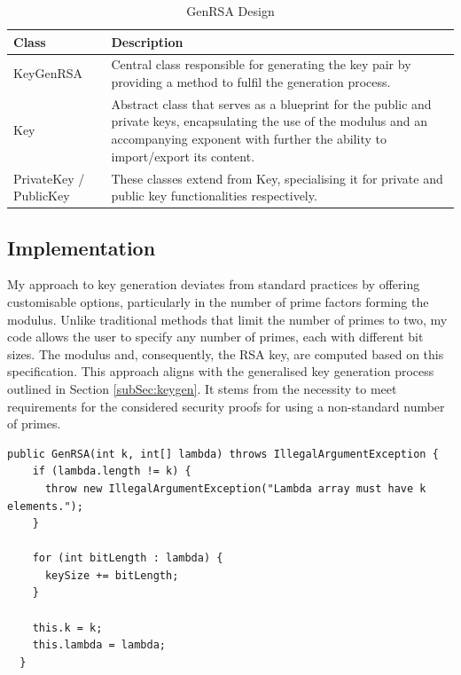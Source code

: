 \documentclass[]{final_report}
\theoremstyle{definition}
\begin{document}
\begin{table}[H]
    \centering
    \caption{GenRSA Design}
    \label{tab:actors_description}
    \begin{tabular}{|l|p{10cm}|}
    \hline
    \textbf{Class} & \textbf{Description} \\
    \hline
    KeyGenRSA & Central class responsible for generating the key pair by providing a method to fulfil the generation process. \\
    \hline
    Key & Abstract class that serves as a blueprint for the public and private keys, encapsulating the use of the modulus and an accompanying exponent with further the ability to import/export its content. \\
    \hline
    PrivateKey / PublicKey & These classes extend from Key, specialising it for private and public key functionalities respectively. \\
    \hline
    \end{tabular}
\end{table}



\subsection{Implementation}
My approach to key generation deviates from standard practices by offering customisable options, particularly in the number of prime factors forming the modulus. Unlike traditional methods that limit the number of primes to two, my code allows the user to specify any number of primes, each with different bit sizes. The modulus and, consequently, the RSA key, are computed based on this specification. This approach aligns with the generalised key generation process outlined in Section \ref{subSec:keygen}. It stems from the necessity to meet requirements for the considered security proofs for using a non-standard number of primes.

\begin{lstlisting}[caption=Initialisation of parametrisable Key Generation]
public GenRSA(int k, int[] lambda) throws IllegalArgumentException {
    if (lambda.length != k) {
      throw new IllegalArgumentException("Lambda array must have k elements.");
    }

    for (int bitLength : lambda) {
      keySize += bitLength;
    }

    this.k = k;
    this.lambda = lambda;
  }
 \end{lstlisting}
 
\end{document}
